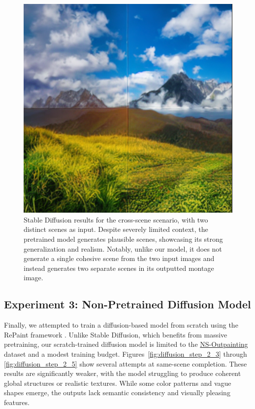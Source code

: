 \documentclass[sigconf]{acmart}
\begin{document}
\begin{figure}[h!]
    \centering
    \includegraphics[width=\linewidth]{stable_diffusion_step_5}
    \caption{Stable Diffusion results for the cross-scene scenario, with two distinct scenes as input. Despite severely limited context, the pretrained model generates plausible scenes, showcasing its strong generalization and realism. Notably, unlike our model, it does not generate a single cohesive scene from the two input images and instead generates two separate scenes in its outputted montage image.}
    \label{fig:stable_diffusion_step_5}
\end{figure}

\subsection*{Experiment 3: Non-Pretrained Diffusion Model}

Finally, we attempted to train a diffusion-based model from scratch using the RePaint framework \cite{Lugmayr2022}. Unlike Stable Diffusion, which benefits from massive pretraining, our scratch-trained diffusion model is limited to the \textcolor{red}{\href{https://github.com/z-x-yang/NS-Outpainting}{NS-Outpainting}} dataset and a modest training budget. Figures~\ref{fig:diffusion_step_2_3} through \ref{fig:diffusion_step_2_5} show several attempts at same-scene completion. These results are significantly weaker, with the model struggling to produce coherent global structures or realistic textures. While some color patterns and vague shapes emerge, the outputs lack semantic consistency and visually pleasing features.
\end{document}
